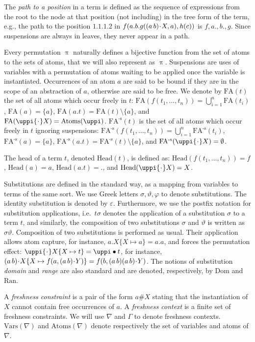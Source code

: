 \documentclass[11pt,a4paper]{amsart}
\theoremstyle{definition}
\newtheorem{definition}{Definition}
\newcommand{\dom}{\mathrm{Dom}}
\newcommand{\ran}{\mathrm{Ran}}
\newcommand{\vars}{\mathrm{Vars}}
\newcommand{\swap}[2]{\ensuremath{(#1\, #2)}}
\newcommand{\head}{\mathrm{Head}}
\newcommand{\permap}{{\mkern 1mu\cdot \mkern 1mu}}
\newcommand{\permef}{\bullet}
\newcommand{\ids}{\varepsilon}
\newcommand\ppi{\uppi}
\newcommand{\atoms}{\mathrm{Atoms}}
\newcommand{\fatoms}{\mathrm{FA^{\text{-s}}}}
\newcommand{\fatom}{\mathrm{FA}}
\begin{document}
The \emph{path to a position} in a term is defined as the
sequence of expressions from the root to the node at that position (not
including) in the tree form of the term, e.g., the
path to the position $1.1.1.2$ in $f(a.b.g(\swap{a}{b}\permap X,a), h(c))$ is $f,a.,b.,g$. Since suspensions are always in leaves, they never appear in a path.

Every permutation $\ppi$ naturally defines a bijective function from
the set of atoms to the sets of atoms, that we will also represent as
$\ppi$. Suspensions are uses of variables with a permutation of atoms
waiting to be applied once the variable is instantiated. Occurrences
of an atom $a$ are said to be bound if they are in the scope of an
abstraction of $a$, otherwise are said to be free. We
  denote by $\fatom(t)$ the set of all atoms which occur freely in
  $t$: $\fatom(f(t_1,\ldots,t_n))=\bigcup_{i=1}^{n} \fatom(t_i)$,
  $\fatom(a)=\{a\}$, $\fatom(a.t)=\fatom(t)\setminus\{a\}$, and
  $\fatom(\ppi\permap X)=\atoms(\ppi)$.
  $\fatoms(t)$ is the set of all atoms which occur freely in
  $t$ ignoring suspensions:
  $\fatoms(f(t_1,\ldots,t_n))=\bigcup_{i=1}^{n} \fatoms(t_i)$,
  $\fatoms(a)=\{a\}$, $\fatoms(a.t)=\fatoms(t)\setminus\{a\}$, and
  $\fatoms(\ppi\permap X)=\emptyset$.

The head of a term $t$, denoted $\head(t)$, is defined as: $\head({ f(t_1,\ldots,t_n)})= f$, $\head({ a})= a$, $\head({
  a.t})= .$, and $\head({ \ppi\permap X}) = X$.

Substitutions are defined in the standard way, as a mapping from
variables to terms of the same sort.
We use Greek letters
$\sigma,\vartheta,\varphi$ to denote substitutions. The identity
substitution is denoted by $\ids$. 
Furthermore, we use the postfix notation for substitution applications, i.e.~$t\sigma$ denotes the application of a substitution $\sigma$ to a term $t$, and similarly, the composition of two substitutions $\sigma$ and $\vartheta$ is written as $\sigma\vartheta$. Composition of two substitutions is performed as usual.
Their application allows atom
capture, for instance, $a.X\{X\mapsto a\}= a.a$, and forces the
permutation effect: $\ppi\permap X\{X\mapsto t\}=\ppi\permef t$, for
instance, $\swap{a}{b}\permap X\{X\mapsto f(a,\swap{a}{b}\permap
Y)\}=f(b,\swap{a}{b}\swap{a}{b}\permap Y)$. The notions of substitution
\emph{domain} and \emph{range} are also standard and are denoted,
respectively, by $\dom$ and $\ran$.

A \emph{freshness constraint} is a pair of the form $a \# X$ stating
that the instantiation of $ X$ cannot contain free occurrences of
$a$. A \emph{freshness context} is a finite set of freshness
  constraints. We will use $\nabla$ and $\Gamma$ to denote freshness
  contexts. $\vars(\nabla)$ and $\atoms(\nabla)$ denote respectively
the set of variables and atoms of $\nabla$.
\end{document}
